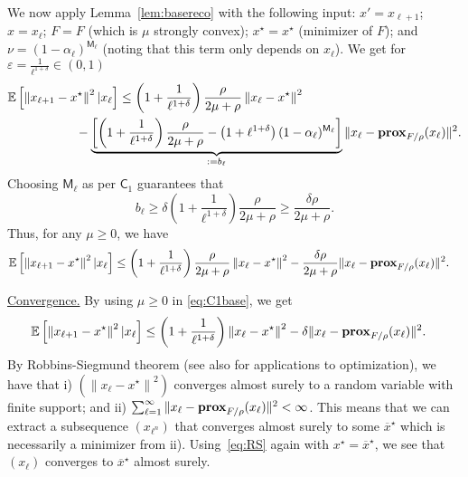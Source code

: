     We now apply Lemma~\ref{lem:basereco} with the following input: $x' = x_{\ell+1}$; $x = x_\ell$; $F = F$ (which is $\mu$ strongly convex); $x^\star =x^\star$ (minimizer of $F$); and $\nu = \left( 1-\alpha_\ell  \right)^{\mathsf{M}_\ell}$ (noting that this term only depends on $x_\ell$). We get for $\varepsilon = \frac{1}{\ell^{1+\delta}} \in (0,1)$
        \begin{align*}
        \EE \left[   \left\|x_{\ell+1} - x^\star  \right\|^2 | x_\ell \right] &\leq \left( 1 + \frac{1}{\ell^{1+\delta}} \right)  \frac{{\rho }}{2\mu + {\rho }}  \left\| x_\ell - x^\star \right\|^2 \\
   \nonumber     &\hspace*{-1.2cm} - \underbrace{\left[ \left(1 + \frac{1}{\ell^{1+\delta}}\right) \frac{{\rho }}{2\mu + {\rho }}  - \left( 1 + \ell^{1+\delta} \right)  (1-\alpha_\ell)^{\mathsf{M}_\ell}  \right]}_{:= b_\ell}  \|x_\ell -  \prox_{F/{\rho }}(x_\ell)   \|^2.
     \end{align*}
     Choosing $\mathsf{M}_\ell$
     as per $\mathsf{C}_1$ guarantees that
     $$
     b_\ell \geq \delta \left( 1 + \frac{1}{\ell^{1+\delta}} \right)  \frac{{\rho }}{2\mu + {\rho }} \geq    \frac{{\delta  \rho }}{2\mu + {\rho }} .
     $$ 
     Thus, for any $\mu\geq 0$, %
     we have
     \begin{align}\label{eq:C1base}
        \mathbb{E} \left[   \left\|x_{\ell+1} - x^\star  \right\|^2 | x_\ell \right] &\leq \left( 1 + \frac{1}{\ell^{1+\delta}} \right) \frac{{ \rho }}{2\mu + {\rho }}  \left\| x_\ell - x^\star \right\|^2 -  \frac{{\delta  \rho }}{2\mu + {\rho }} \|x_\ell -  \mathbf{prox}_{F/{\rho }}(x_\ell)   \|^2.
     \end{align}
     
     \vspace*{1ex}
     \noindent\underline{Convergence.} By using $\mu\geq 0$ in \;\eqref{eq:C1base}, we get 
          \begin{align}
          \label{eq:RS}
        \mathbb{E} \left[   \left\|x_{\ell+1} - x^\star  \right\|^2 | x_\ell \right] &\leq \left( 1 + \frac{1}{\ell^{1+\delta}} \right)  \left\| x_\ell - x^\star \right\|^2 -  \delta \|x_\ell -  \mathbf{prox}_{F/{\rho }}(x_\ell)   \|^2 .
     \end{align}
     By Robbins-Siegmund theorem \cite[Th.~1]{robbins1971convergence} (see also \cite{iutzeler2013asynchronous,bianchi2015coordinate,combettes2015stochastic} for applications to optimization), we have that i) $(\left\|x_{\ell} - x^\star  \right\|^2)$ converges almost surely to a random variable with finite support; and ii) $ \sum_{\ell=1}^\infty \|x_\ell -  \mathbf{prox}_{F/{\rho }}(x_\ell)   \|^2 < \infty$. This means that we can extract a subsequence $(x_{\ell^n})$ that converges almost surely to some $\overline{x}^\star$ which is necessarily a minimizer from ii). Using~\eqref{eq:RS} again with $x^\star = \overline{x}^\star$, we see that $(x_{\ell})$ converges to $\overline{x}^\star$ almost surely.
     
